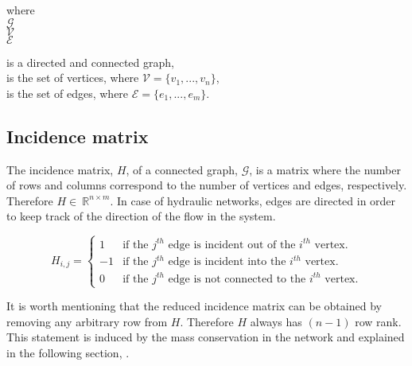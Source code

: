 \vspace{-3mm}

\begin{minipage}[t]{0.2\textwidth}
where\\
\hspace*{8mm} $\mathcal{G} $ \\
\hspace*{8mm} $\mathcal{V} $ \\
\hspace*{8mm} $\mathcal{E} $
\end{minipage}
\begin{minipage}[t]{0.68\textwidth}
\vspace*{2mm}
is a directed and connected graph,\\
is the set of vertices, where $\mathcal{V} = \{v_1, ..., v_n\}$,\\
is the set of edges, where $\mathcal{E} = \{e_1, ..., e_m\}$. 
\end{minipage}

\subsection{Incidence matrix}
\label{incidence_matrix}

The incidence matrix, $H$, of a connected graph, $\mathcal{G}$, is a matrix where the number of rows and columns correspond to the number of vertices and edges, respectively. Therefore $H\in \: \mathbb{R}^{n \times m}$. In case of hydraulic networks, edges are directed in order to keep track of the direction of the flow in the system. 

\begin{equation}
\label{DiGraph}
 H_{i,j} =
		\left\{
		\begin{array}{ll}
		
		1 			&      \text{if the $j^{th}$ edge is incident out of the $i^{th}$ vertex}.	
\\
	    -1          &      \text{if the $j^{th}$ edge is incident into the $i^{th}$ vertex}.
\\
        0           &      \text{if the $j^{th}$ edge is not connected to the $i^{th}$ vertex}.

		\end{array}
		\right.
\end{equation}	

It is worth mentioning that the reduced incidence matrix can be obtained by removing any arbitrary row from $H$. Therefore $H$ always has $(n-1)$ row rank. This statement is induced by the mass conservation in the network and explained in the following section, .


